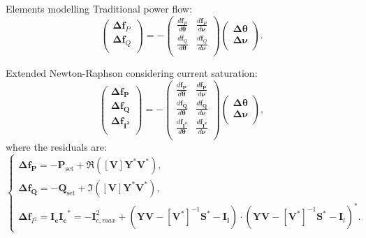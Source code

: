 \begin{frame}{Elements modelling}
Traditional power flow:
\begin{equation}
  \begin{pmatrix}
    \bm{\Delta f}_P \\
    \bm{\Delta f}_Q \\
  \end{pmatrix} = -
  \begin{pmatrix}
    \frac{d \bm{f}_P}{d \bm{\theta}} & \frac{d \bm{f}_P}{d \bm{\nu}} \\
    \frac{d \bm{f}_Q}{d \bm{\theta}} & \frac{d \bm{f}_Q}{d \bm{\nu}} \\
  \end{pmatrix}
  \begin{pmatrix}
    \bm{\Delta \theta} \\
    \bm{\Delta \nu} \\
  \end{pmatrix}.
  \label{eq:syst2xx}
\end{equation}

Extended Newton-Raphson considering current saturation:
\begin{equation}
  \begin{pmatrix}
    \bm{\Delta f_P} \\
    \bm{\Delta f_Q} \\
    \bm{\Delta f_{I^2}} \\
  \end{pmatrix} = -
  \begin{pmatrix}
    \frac{d \bm{f_P}}{d \bm{\theta}} & \frac{d \bm{f_P}}{d \bm{\nu}} \\
    \frac{d \bm{f_Q}}{d \bm{\theta}} & \frac{d \bm{f_Q}}{d \bm{\nu}} \\
    \frac{d \bm{f_{I^2}}}{d \bm{\theta}} & \frac{d \bm{f_{I^2}}}{d \bm{\nu}} \\
  \end{pmatrix}
  \begin{pmatrix}
    \bm{\Delta \theta} \\
    \bm{\Delta \nu} \\
  \end{pmatrix},
  \label{eq:systfin}
\end{equation}
where the residuals are:
\begin{equation}
  \begin{cases}
    \bm{\Delta f_P} = -\bm{P}_\text{set} + \Re([\bm{V}]\bm{Y}^*\bm{V}^*),\\
    \bm{\Delta f_Q} = -\bm{Q}_\text{set} + \Im([\bm{V}]\bm{Y}^*\bm{V}^*),\\
  \bm{\Delta f}_{I^2} =  \bm{I_c} \bm{I_c}^* = - \bm{I}_{c,max}^2 + (\bm{Y}\bm{V} - [\bm{V}^*]^{-1} \bm{S}^* - \bm{I_l}) \cdot (\bm{Y}\bm{V} - [\bm{V}^*]^{-1} \bm{S}^* - \bm{I}_l)^*.
\end{cases}
\end{equation}
\end{frame}

